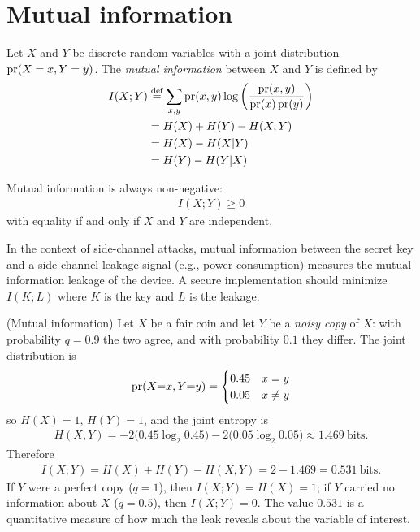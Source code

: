 \documentclass[a4paper, 12pt]{book} %
\begin{document}
\section{Mutual information}

\begin{definition}
    Let $X$ and $Y$ be discrete random variables with a joint distribution $\operatorname{pr}(X=x, Y=y)$. The \emph{mutual information} between $X$ and $Y$ is defined by
    \begin{align}
        I(X; Y) &\overset{\text{def}}{=} \sum_{x,y} \operatorname{pr}(x, y) \log\left( \frac{\operatorname{pr}(x, y)}{\operatorname{pr}(x) \operatorname{pr}(y)} \right) \\
        &= H(X) + H(Y) - H(X, Y) \\
        &= H(X) - H(X|Y) \\
        &= H(Y) - H(Y|X)
    \end{align}
\end{definition}

\begin{proposition}
    Mutual information is always non-negative:
    \begin{align}
        I(X; Y) \geq 0
    \end{align}
    with equality if and only if $X$ and $Y$ are independent.
\end{proposition}

\begin{remark}
    In the context of side-channel attacks, mutual information between the secret key and a side-channel leakage signal (e.g., power consumption) measures the mutual information leakage of the device. A secure implementation should minimize $I(K; L)$ where $K$ is the key and $L$ is the leakage.
\end{remark}

\begin{example}
    (Mutual information) Let $X$ be a fair coin and let $Y$ be a \emph{noisy copy} of $X$: with probability $q = 0.9$ the two agree, and with probability $0.1$ they differ. The joint distribution is
    \begin{align}
        \operatorname{pr}(X{=}x, Y{=}y) = \begin{cases} 0.45 & x = y \\ 0.05 & x \neq y \end{cases}
    \end{align}
    so $H(X) = 1$, $H(Y) = 1$, and the joint entropy is
    \begin{align}
        H(X,Y) = -2\big(0.45\log_2 0.45\big) - 2\big(0.05 \log_2 0.05\big) \approx 1.469 \ \text{bits}.
    \end{align}
    Therefore
    \begin{align}
        I(X;Y) = H(X) + H(Y) - H(X,Y) = 2 - 1.469 = 0.531 \ \text{bits}.
    \end{align}
    If $Y$ were a perfect copy ($q = 1$), then $I(X;Y) = H(X) = 1$; if $Y$ carried no information about $X$ ($q = 0.5$), then $I(X;Y) = 0$. The value $0.531$ is a quantitative measure of how much the leak reveals about the variable of interest.
\end{example}
\end{document}
